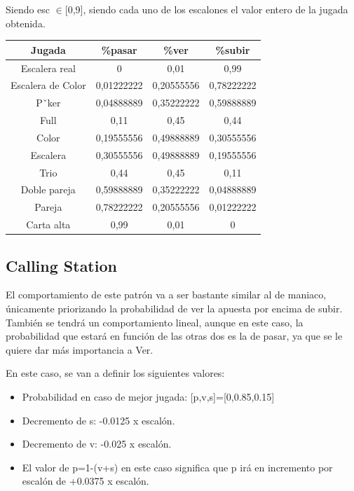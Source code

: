 Siendo esc $\in$[0,9], siendo cada uno de los escalones el valor entero de la jugada obtenida.

\begin{longtable}[c]{|c|c|c|c|}
\hline
\rowcolor{lightgray}Jugada & \%pasar & \%ver & \%subir \\ \hline
Escalera real & 0 & 0,01 & 0,99 \\ \hline
Escalera de Color & 0,01222222 & 0,20555556 & 0,78222222 \\ \hline
Pˇker & 0,04888889 & 0,35222222 & 0,59888889 \\ \hline
Full & 0,11 & 0,45 & 0,44 \\ \hline
Color & 0,19555556 & 0,49888889 & 0,30555556 \\ \hline
Escalera & 0,30555556 & 0,49888889 & 0,19555556 \\ \hline
Trio & 0,44 & 0,45 & 0,11 \\ \hline
Doble pareja & 0,59888889 & 0,35222222 & 0,04888889 \\ \hline
Pareja & 0,78222222 & 0,20555556 & 0,01222222 \\ \hline
Carta alta & 0,99 & 0,01 & 0 \\ \hline
\end{longtable}

\subsection{Calling Station}

El comportamiento de este patrón va a ser bastante similar al de maniaco, únicamente priorizando la probabilidad de ver la apuesta por encima de subir. También se tendrá un comportamiento lineal, aunque en este caso, la probabilidad que estará en función de las otras dos es la de pasar, ya que se le quiere dar más importancia a Ver.

En este caso, se van a definir los siguientes valores:
\begin{itemize}
\item Probabilidad en caso de mejor jugada: [p,v,s]=[0,0.85,0.15] 
\item Decremento de s: -0.0125 x escalón.
\item  Decremento de v: -0.025 x escalón.
\item El valor de p=1-(v+s) en este caso significa que p irá en incremento por escalón de +0.0375 x escalón.
\end{itemize}

